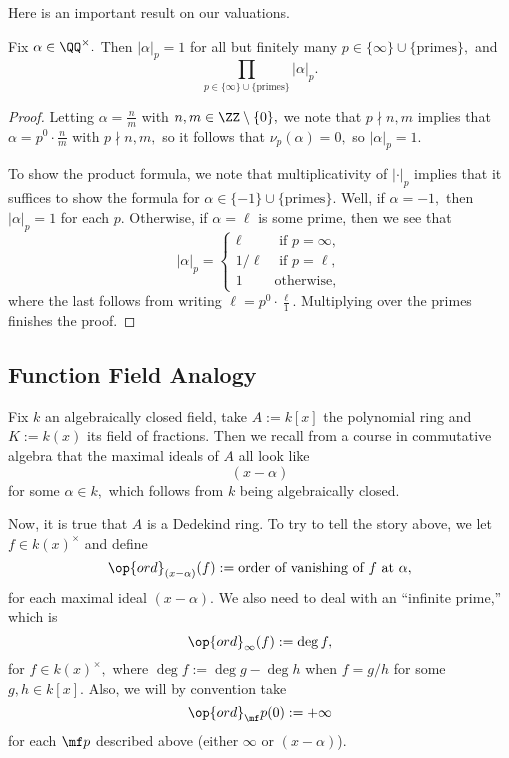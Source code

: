 \documentclass[../notes.tex]{subfiles}
\begin{document}
Here is an important result on our valuations.
\begin{theorem}
	Fix $\alpha\in\QQ^\times.$ Then $|\alpha|_p=1$ for all but finitely many $p\in\{\infty\}\cup\{\text{primes}\},$ and
	\[\prod_{p\in\{\infty\}\cup\{\text{primes}\}}|\alpha|_p.\]
\end{theorem}
\begin{proof}
	Letting $\alpha=\frac nm$ with $n,m\in\ZZ\setminus\{0\},$ we note that $p\nmid n,m$ implies that $\alpha=p^0\cdot\frac nm$ with $p\nmid n,m,$ so it follows that $\nu_p(\alpha)=0,$ so $|\alpha|_p=1.$

	To show the product formula, we note that multiplicativity of $|\cdot|_p$ implies that it suffices to show the formula for $\alpha\in\{-1\}\cup\{\text{primes}\}.$ Well, if $\alpha=-1,$ then $|\alpha|_p=1$ for each $p.$ Otherwise, if $\alpha=\ell$ is some prime, then we see that
	\[|\alpha|_p=\begin{cases}
		\ell & \text{ if }p=\infty, \\
		1/\ell & \text{ if }p=\ell, \\
		1 & \text{otherwise},
	\end{cases}\]
	where the last follows from writing $\ell=p^0\cdot\frac\ell1.$ Multiplying over the primes finishes the proof.
\end{proof}

\subsection{Function Field Analogy}
Fix $k$ an algebraically closed field, take $A:=k[x]$ the polynomial ring and $K:=k(x)$ its field of fractions. Then we recall from a course in commutative algebra that the maximal ideals of $A$ all look like
\[(x-\alpha)\]
for some $\alpha\in k,$ which follows from $k$ being algebraically closed.

Now, it is true that $A$ is a Dedekind ring. To try to tell the story above, we let $f\in k(x)^\times$ and define
\[\op{ord}_{(x-\alpha)}(f):=\text{order of vanishing of }f\text{ at }\alpha,\]
for each maximal ideal $(x-\alpha).$ We also need to deal with an ``infinite prime,'' which is
\[\op{ord}_\infty(f):=\deg f,\]
for $f\in k(x)^\times,$ where $\deg f:=\deg g-\deg h$ when $f=g/h$ for some $g,h\in k[x].$ Also, we will by convention take
\[\op{ord}_\mf p(0):=+\infty\]
for each $\mf p$ described above (either $\infty$ or $(x-\alpha)$).
\end{document}
